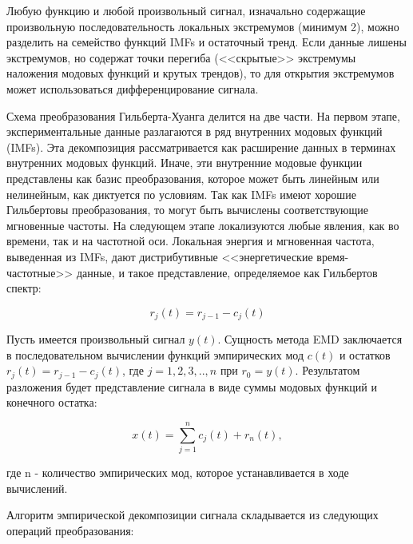 \documentclass[utf8x, 14pt, oneside, a4paper]{article}
\begin{document}
	Любую функцию и любой произвольный сигнал, изначально содержащие произвольную последовательность локальных экстремумов (минимум 2), можно разделить на семейство функций IMFs и остаточный тренд. Если данные лишены экстремумов, но содержат точки перегиба (<<скрытые>> экстремумы наложения модовых функций и крутых трендов), то для открытия экстремумов может использоваться дифференцирование сигнала.
	
	Схема преобразования Гильберта-Хуанга делится на две части. На первом этапе, экспериментальные данные разлагаются в ряд внутренних модовых функций (IMFs). Эта декомпозиция рассматривается как расширение данных в терминах внутренних модовых функций. Иначе, эти внутренние модовые функции представлены как базис преобразования, которое может быть линейным или нелинейным, как диктуется по условиям. Так как IMFs имеют хорошие Гильбертовы преобразования, то могут быть вычислены соответствующие мгновенные частоты. На следующем этапе локализуются любые явления, как во времени, так и на частотной оси. Локальная энергия и мгновенная частота, выведенная из IMFs, дают дистрибутивные <<энергетические время-частотные>> данные, и такое представление, определяемое как Гильбертов спектр: 
	
	\begin{equation}
		r_j(t) = r_{j-1}-c_j(t)
	\end{equation}

	Пусть имеется произвольный сигнал $y(t)$. Сущность метода EMD заключается в последовательном вычислении функций эмпирических
	мод $c(t)$ и остатков $r_j(t) = r_{j-1}-c_j(t)$, где $j=1,2,3,..,n$ при $r_0=y(t)$. Результатом разложения будет представление сигнала в виде суммы модовых функций и конечного остатка:
	
	\begin{equation}\label{eq:huang_main}
		x(t) = \sum_{j=1}^{n}c_j(t)+r_n(t),
	\end{equation}

	где n - количество эмпирических мод, которое устанавливается в ходе вычислений.
	
	Алгоритм эмпирической декомпозиции сигнала складывается из следующих операций преобразования:
	
\end{document}

